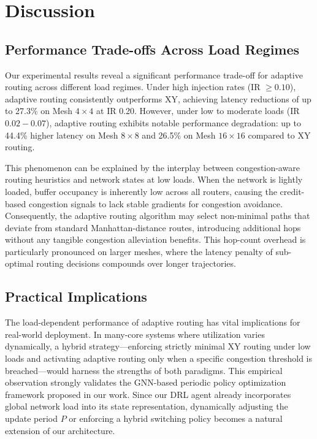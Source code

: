 \section{Discussion}
\label{sec:discussion}

\subsection{Performance Trade-offs Across Load Regimes}

Our experimental results reveal a significant performance trade-off for adaptive routing across different load regimes. Under high injection rates (IR $\geq 0.10$), adaptive routing consistently outperforms XY, achieving latency reductions of up to 27.3\% on Mesh $4\times4$ at IR 0.20. However, under low to moderate loads (IR $0.02-0.07$), adaptive routing exhibits notable performance degradation: up to 44.4\% higher latency on Mesh $8\times8$ and 26.5\% on Mesh $16\times16$ compared to XY routing.

This phenomenon can be explained by the interplay between congestion-aware routing heuristics and network states at low loads. When the network is lightly loaded, buffer occupancy is inherently low across all routers, causing the credit-based congestion signals to lack stable gradients for congestion avoidance. Consequently, the adaptive routing algorithm may select non-minimal paths that deviate from standard Manhattan-distance routes, introducing additional hops without any tangible congestion alleviation benefits. This hop-count overhead is particularly pronounced on larger meshes, where the latency penalty of sub-optimal routing decisions compounds over longer trajectories.

\subsection{Practical Implications}

The load-dependent performance of adaptive routing has vital implications for real-world deployment. In many-core systems where utilization varies dynamically, a hybrid strategy---enforcing strictly minimal XY routing under low loads and activating adaptive routing only when a specific congestion threshold is breached---would harness the strengths of both paradigms. This empirical observation strongly validates the GNN-based periodic policy optimization framework proposed in our work. Since our DRL agent already incorporates global network load into its state representation, dynamically adjusting the update period $P$ or enforcing a hybrid switching policy becomes a natural extension of our architecture.

